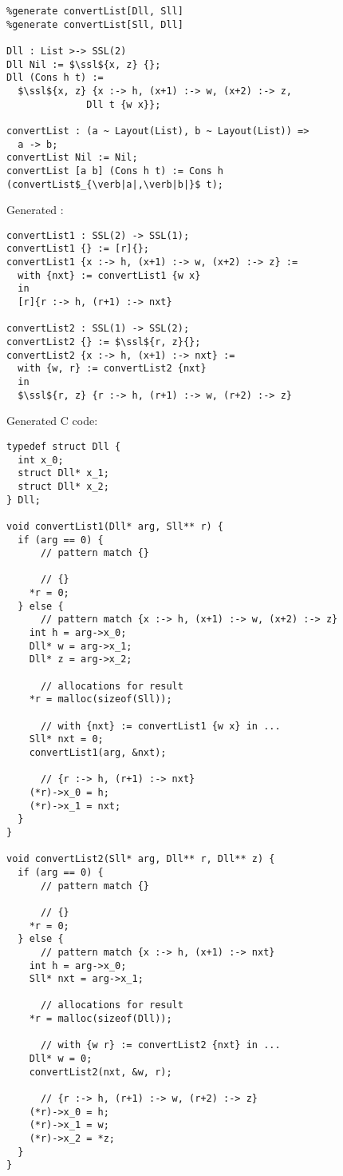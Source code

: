 \begin{lstlisting}
%generate convertList[Dll, Sll]
%generate convertList[Sll, Dll]

Dll : List >-> SSL(2)
Dll Nil := $\ssl${x, z} {};
Dll (Cons h t) :=
  $\ssl${x, z} {x :-> h, (x+1) :-> w, (x+2) :-> z,
              Dll t {w x}};

convertList : (a ~ Layout(List), b ~ Layout(List)) =>
  a -> b;
convertList Nil := Nil;
convertList [a b] (Cons h t) := Cons h (convertList$_{\verb|a|,\verb|b|}$ t);
\end{lstlisting}

Generated \PikaCore:

\begin{lstlisting}
convertList1 : SSL(2) -> SSL(1);
convertList1 {} := [r]{};
convertList1 {x :-> h, (x+1) :-> w, (x+2) :-> z} :=
  with {nxt} := convertList1 {w x}
  in
  [r]{r :-> h, (r+1) :-> nxt}

convertList2 : SSL(1) -> SSL(2);
convertList2 {} := $\ssl${r, z}{};
convertList2 {x :-> h, (x+1) :-> nxt} :=
  with {w, r} := convertList2 {nxt}
  in
  $\ssl${r, z} {r :-> h, (r+1) :-> w, (r+2) :-> z}
\end{lstlisting}

Generated C code:

\begin{lstlisting}
typedef struct Dll {
  int x_0;
  struct Dll* x_1;
  struct Dll* x_2;
} Dll;

void convertList1(Dll* arg, Sll** r) {
  if (arg == 0) {
      // pattern match {}

      // {}
    *r = 0;
  } else {
      // pattern match {x :-> h, (x+1) :-> w, (x+2) :-> z}
    int h = arg->x_0;
    Dll* w = arg->x_1;
    Dll* z = arg->x_2;

      // allocations for result
    *r = malloc(sizeof(Sll));

      // with {nxt} := convertList1 {w x} in ...
    Sll* nxt = 0;
    convertList1(arg, &nxt);

      // {r :-> h, (r+1) :-> nxt}
    (*r)->x_0 = h;
    (*r)->x_1 = nxt;
  }
}

void convertList2(Sll* arg, Dll** r, Dll** z) {
  if (arg == 0) {
      // pattern match {}

      // {}
    *r = 0;
  } else {
      // pattern match {x :-> h, (x+1) :-> nxt}
    int h = arg->x_0;
    Sll* nxt = arg->x_1;

      // allocations for result
    *r = malloc(sizeof(Dll));

      // with {w r} := convertList2 {nxt} in ...
    Dll* w = 0;
    convertList2(nxt, &w, r);

      // {r :-> h, (r+1) :-> w, (r+2) :-> z}
    (*r)->x_0 = h;
    (*r)->x_1 = w;
    (*r)->x_2 = *z;
  }
}
\end{lstlisting}

